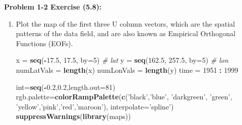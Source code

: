 \documentclass[11pt]{article}
\newenvironment{problem}[1]{\textbf{Problem #1:}}{\newpage}
\newenvironment{Shaded}{\begin{snugshade}}{\end{snugshade}}
\newcommand{\CommentTok}[1]{\textcolor[rgb]{0.56,0.35,0.01}{\textit{#1}}}
\newcommand{\DataTypeTok}[1]{\textcolor[rgb]{0.13,0.29,0.53}{#1}}
\newcommand{\DecValTok}[1]{\textcolor[rgb]{0.00,0.00,0.81}{#1}}
\newcommand{\FloatTok}[1]{\textcolor[rgb]{0.00,0.00,0.81}{#1}}
\newcommand{\KeywordTok}[1]{\textcolor[rgb]{0.13,0.29,0.53}{\textbf{#1}}}
\newcommand{\NormalTok}[1]{#1}
\newcommand{\OperatorTok}[1]{\textcolor[rgb]{0.81,0.36,0.00}{\textbf{#1}}}
\newcommand{\StringTok}[1]{\textcolor[rgb]{0.31,0.60,0.02}{#1}}
\begin{document}
\begin{problem}{1-2 Exercise (5.8)}
\begin{enumerate}[label = (\alph*)]
\newpage
\item Plot the map of the first three U column vectors, which are the spatial patterns of the
data field, and are also known as Empirical Orthogonal Functions (EOFs).

\begin{Shaded}
\begin{Highlighting}[]
\NormalTok{x =}\StringTok{ }\KeywordTok{seq}\NormalTok{(}\OperatorTok{-}\FloatTok{17.5}\NormalTok{, }\FloatTok{17.5}\NormalTok{, }\DataTypeTok{by=}\DecValTok{5}\NormalTok{)  }\CommentTok{# lat}
\NormalTok{y =}\StringTok{ }\KeywordTok{seq}\NormalTok{(}\FloatTok{162.5}\NormalTok{, }\FloatTok{257.5}\NormalTok{, }\DataTypeTok{by=}\DecValTok{5}\NormalTok{) }\CommentTok{# lon}
\NormalTok{numLatVals =}\StringTok{ }\KeywordTok{length}\NormalTok{(x)}
\NormalTok{numLonVals =}\StringTok{ }\KeywordTok{length}\NormalTok{(y)}
\NormalTok{time =}\StringTok{ }\DecValTok{1951} \OperatorTok{:}\StringTok{ }\DecValTok{1999}

\NormalTok{int=}\KeywordTok{seq}\NormalTok{(}\OperatorTok{-}\FloatTok{0.2}\NormalTok{,}\FloatTok{0.2}\NormalTok{,}\DataTypeTok{length.out=}\DecValTok{81}\NormalTok{)}
\NormalTok{rgb.palette=}\KeywordTok{colorRampPalette}\NormalTok{(}\KeywordTok{c}\NormalTok{(}\StringTok{'black'}\NormalTok{,}\StringTok{'blue'}\NormalTok{, }\StringTok{'darkgreen'}\NormalTok{,}
                               \StringTok{'green'}\NormalTok{, }\StringTok{'yellow'}\NormalTok{,}\StringTok{'pink'}\NormalTok{,}\StringTok{'red'}\NormalTok{,}\StringTok{'maroon'}\NormalTok{),}
                               \DataTypeTok{interpolate=}\StringTok{'spline'}\NormalTok{)}
\KeywordTok{suppressWarnings}\NormalTok{(}\KeywordTok{library}\NormalTok{(maps))}
\end{Highlighting}
\end{Shaded}
			

\end{enumerate}
\end{problem}
\end{document}
